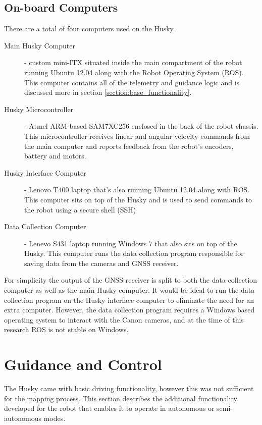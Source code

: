 \subsection{On-board Computers}

There are a total of four computers used on the Husky.

\begin{description}
\item[Main Husky Computer] - custom mini-ITX situated inside the main compartment of the robot running Ubuntu 12.04 along with the Robot Operating System (ROS). This computer contains all of the telemetry and guidance logic and is discussed more in section \ref{section:base_functionality}.  
\item[Husky Microcontroller] - Atmel ARM-based SAM7XC256 enclosed in the back of the robot chassis.  This microcontroller receives linear and angular velocity commands from the main computer and reports feedback from the robot's encoders, battery and motors. 
\item[Husky Interface Computer] - Lenovo T400 laptop that's also running Ubuntu 12.04 along with ROS.  This computer sits on top of the Husky and is used to send commands to the robot using a secure shell (SSH)
\item[Data Collection Computer] - Lenevo S431 laptop running Windows 7 that also sits on top of the Husky.  This computer runs the data collection program responsible for saving data from the cameras and GNSS receiver.   
\end{description}

For simplicity the output of the GNSS receiver is split to both the data collection computer as well as the main Husky computer.  It would be ideal to run the data collection program on the Husky interface computer to eliminate the need for an extra computer.  However, the data collection program requires a Windows based operating system to interact with the Canon cameras, and at the time of this research ROS is not stable on Windows. 

\section{Guidance and Control}

The Husky came with basic driving functionality, however this was not sufficient for the mapping process.  This section describes the additional functionality developed for the robot that enables it to operate in autonomous or semi-autonomous modes.  

